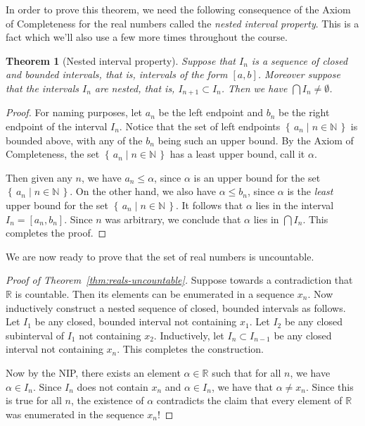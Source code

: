 \documentclass[11pt,oneside]{amsbook}
\newcommand{\set}[1]{\left\{\,#1\,\right\}}
\newcommand{\N}{\mathbb N}
\newcommand{\R}{\mathbb R}
\theoremstyle{definition}
\theoremstyle{plain}
\newtheorem{theorem}{Theorem}[section]
\theoremstyle{definition}
\theoremstyle{remark}
\numberwithin{equation}{section}
\numberwithin{figure}{section}
\begin{document}
In order to prove this theorem, we need the following consequence of the Axiom of Completeness for the real numbers called the \emph{nested interval property}. This is a fact which we'll also use a few more times throughout the course.

\begin{theorem}[Nested interval property]
  Suppose that $I_n$ is a sequence of closed and bounded intervals, that is, intervals of the form $[a,b]$. Moreover suppose that the intervals $I_n$ are nested, that is, $I_{n+1}\subset I_n$. Then we have $\bigcap I_n\neq\emptyset$.
\end{theorem}

\begin{proof}
  For naming purposes, let $a_n$ be the left endpoint and $b_n$ be the right endpoint of the interval $I_n$. Notice that the set of left endpoints $\set{a_n\mid n\in\N}$ is bounded above, with any of the $b_n$ being such an upper bound. By the Axiom of Completeness, the set $\set{a_n\mid n\in\N}$ has a least upper bound, call it $\alpha$.

  Then given any $n$, we have $a_n\leq\alpha$, since $\alpha$ is an upper bound for the set $\set{a_n\mid n\in\N}$. On the other hand, we also have $\alpha\leq b_n$, since $\alpha$ is the \emph{least} upper bound for the set $\set{a_n\mid n\in\N}$. It follows that $\alpha$ lies in the interval $I_n=[a_n,b_n]$. Since $n$ was arbitrary, we conclude that $\alpha$ lies in $\bigcap I_n$. This completes the proof.
\end{proof}

We are now ready to prove that the set of real numbers is uncountable.

\begin{proof}[Proof of Theorem~\ref{thm:reals-uncountable}]
  Suppose towards a contradiction that $\R$ is countable. Then its elements can be enumerated in a sequence $x_n$. Now inductively construct a nested sequence of closed, bounded intervals as follows. Let $I_1$ be any closed, bounded interval not containing $x_1$. Let $I_2$ be any closed subinterval of $I_1$ not containing $x_2$. Inductively, let $I_n\subset I_{n-1}$ be any closed interval not containing $x_n$. This completes the construction.

  Now by the NIP, there exists an element $\alpha\in\R$ such that for all $n$, we have $\alpha\in I_n$. Since $I_n$ does not contain $x_n$ and $\alpha\in I_n$, we have that $\alpha\neq x_n$. Since this is true for all $n$, the existence of $\alpha$ contradicts the claim that every element of $\R$ was enumerated in the sequence $x_n$!
\end{proof}
\end{document}
